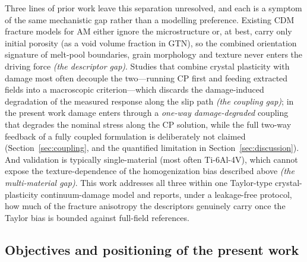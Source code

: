 \documentclass[twocolumn]{sagej}
\begin{document}
Three lines of prior work leave this separation unresolved, and each is a symptom of the same mechanistic gap rather than a modelling preference. Existing CDM fracture models for AM either ignore the microstructure or, at best, carry only initial porosity (as a void volume fraction in GTN), so the combined orientation signature of melt-pool boundaries, grain morphology and texture never enters the driving force \emph{(the descriptor gap)}. Studies that combine crystal plasticity with damage most often decouple the two---running CP first and feeding extracted fields into a macroscopic criterion---which discards the damage-induced degradation of the measured response along the slip path \emph{(the coupling gap)}; in the present work damage enters through a \emph{one-way damage-degraded} coupling that degrades the nominal stress along the CP solution, while the full two-way feedback of a fully coupled formulation is deliberately not claimed (Section~\ref{sec:coupling}, and the quantified limitation in Section~\ref{sec:discussion}). And validation is typically single-material (most often Ti-6Al-4V), which cannot expose the texture-dependence of the homogenization bias described above \emph{(the multi-material gap)}. This work addresses all three within one Taylor-type crystal-plasticity continuum-damage model and reports, under a leakage-free protocol, how much of the fracture anisotropy the descriptors genuinely carry once the Taylor bias is bounded against full-field references.

\subsection{Objectives and positioning of the present work}
\end{document}
